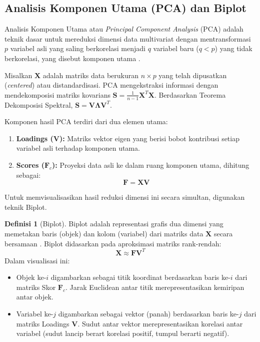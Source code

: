\documentclass[a4paper]{article}
\theoremstyle{definition} %
\newtheorem{definition}{Definisi}[section]
\begin{document}
\subsection{Analisis Komponen Utama (PCA) dan Biplot}

Analisis Komponen Utama atau \textit{Principal Component Analysis} (PCA) adalah teknik dasar untuk mereduksi dimensi data multivariat dengan mentransformasi $p$ variabel asli yang saling berkorelasi menjadi $q$ variabel baru ($q < p$) yang tidak berkorelasi, yang disebut komponen utama \citet{hotelling1933}.

Misalkan $\mathbf{X}$ adalah matriks data berukuran $n \times p$ yang telah dipusatkan (\textit{centered}) atau distandardisasi. PCA mengekstraksi informasi dengan mendekomposisi matriks kovarians $\mathbf{S} = \frac{1}{n-1}\mathbf{X}^T\mathbf{X}$. Berdasarkan Teorema Dekomposisi Spektral, $\mathbf{S} = \mathbf{V} \mathbf{\Lambda} \mathbf{V}^T$.

Komponen hasil PCA terdiri dari dua elemen utama:
\begin{enumerate}
    \item \textbf{Loadings ($\mathbf{V}$):} Matriks vektor eigen yang berisi bobot kontribusi setiap variabel asli terhadap komponen utama.
    \item \textbf{Scores ($\mathbf{F}_c$):} Proyeksi data asli ke dalam ruang komponen utama, dihitung sebagai:
    \begin{equation}
        \mathbf{F} = \mathbf{X} \mathbf{V}
    \end{equation}
\end{enumerate}

Untuk memvisualisasikan hasil reduksi dimensi ini secara simultan, digunakan teknik Biplot.

\begin{definition}[Biplot]
	Biplot adalah representasi grafis dua dimensi yang memetakan baris (objek) dan kolom (variabel) dari matriks data $\mathbf{X}$ secara bersamaan \citet{gabriel1971}. Biplot didasarkan pada aproksimasi matriks rank-rendah:
    \begin{equation}
        \mathbf{X} \approx \mathbf{F} \mathbf{V}^T
    \end{equation}
    Dalam visualisasi ini:
    \begin{itemize}
        \item Objek ke-$i$ digambarkan sebagai titik koordinat berdasarkan baris ke-$i$ dari matriks Skor $\mathbf{F}_c$. Jarak Euclidean antar titik merepresentasikan kemiripan antar objek.
        \item Variabel ke-$j$ digambarkan sebagai vektor (panah) berdasarkan baris ke-$j$ dari matriks Loadings $\mathbf{V}$. Sudut antar vektor merepresentasikan korelasi antar variabel (sudut lancip berart korelasi positif, tumpul berarti negatif).
    \end{itemize}
\end{definition}
\end{document}
